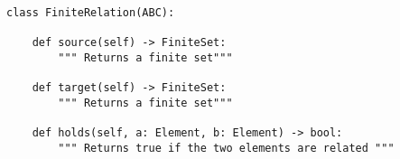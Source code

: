 \begin{verbatim}
class FiniteRelation(ABC):

    def source(self) -> FiniteSet:
        """ Returns a finite set"""

    def target(self) -> FiniteSet:
        """ Returns a finite set"""

    def holds(self, a: Element, b: Element) -> bool:
        """ Returns true if the two elements are related """
\end{verbatim}